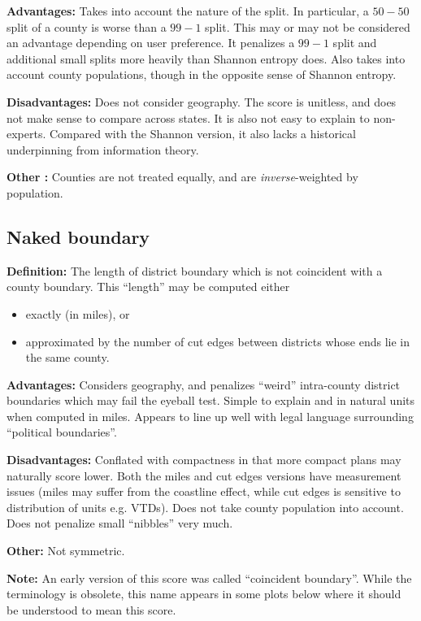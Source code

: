 \documentclass{mgggarticle}
\begin{document}
\textbf{Advantages: } Takes into account the nature of the split. In particular, a $50-50$ split of a county is worse than a $99-1$ split. This may or may not be considered an advantage depending on user preference. It penalizes a $99-1$ split and additional small splits more heavily than Shannon entropy does. Also takes into account county populations, though in the opposite sense of Shannon entropy.

\textbf{Disadvantages: } Does not consider geography. The score is unitless, and does not make sense to compare across states. It is also not easy to explain to non-experts. Compared with the Shannon version, it also lacks a historical underpinning from information theory.

\textbf{Other : } Counties are not treated equally, and are \emph{inverse}-weighted by population.


\subsection{Naked boundary}
\textbf{Definition: } The length of district boundary which is not coincident with a county boundary. This ``length'' may be computed either
\begin{itemize}
\item exactly (in miles), or
\item approximated by the number of cut edges between districts whose ends lie in the same county.
\end{itemize} 

\textbf{Advantages: } Considers geography, and penalizes ``weird'' intra-county district boundaries which may fail the eyeball test. Simple to explain and in natural units when computed in miles. Appears to line up well with legal language surrounding ``political boundaries''.

\textbf{Disadvantages: } Conflated with compactness in that more compact plans may naturally score lower. Both the miles and cut edges versions have measurement issues (miles may suffer from the coastline effect, while cut edges is sensitive to distribution of units e.g. VTDs). Does not take county population into account. Does not penalize small ``nibbles'' very much.

\textbf{Other: } Not symmetric. 

\textbf{Note: } An early version of this score was called ``coincident boundary''. While the terminology is obsolete, this name appears in some plots below where it should be understood to mean this score.
\end{document}
